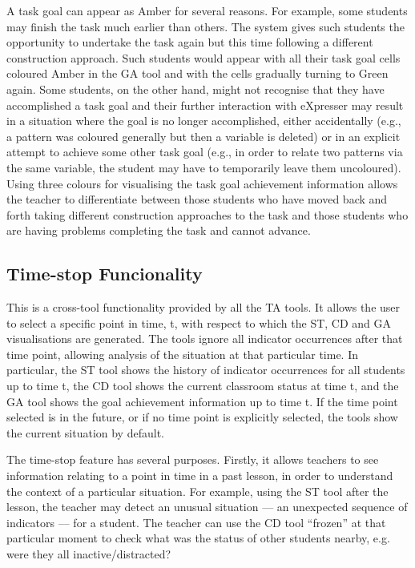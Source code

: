 A task goal can appear as Amber for several reasons. For example, some
students may finish the task much earlier than others. The system
gives such students the opportunity to undertake the task again but
this time following a different construction approach. Such students
would appear with all their task goal cells coloured Amber in the GA
tool and with the cells gradually turning to Green again. Some
students, on the other hand, might not recognise that they have
accomplished a task goal and their further interaction with eXpresser
may result in a situation where the goal is no longer accomplished,
either accidentally (e.g., a pattern was coloured generally but then a
variable is deleted) or in an explicit attempt to achieve some other
task goal (e.g., in order to relate two patterns via the same
variable, the student may have to temporarily leave them
uncoloured). Using three colours for visualising the task goal
achievement information allows the teacher to differentiate between
those students who have moved back and forth taking different
construction approaches to the task and those students who are having
problems completing the task and cannot advance.


\subsection{Time-stop Funcionality}
\label{sec:time-stop-func}

This is a cross-tool functionality provided by all the TA tools. It
allows the user to select a specific point in time, t, with respect to
which the ST, CD and GA visualisations are generated. The tools ignore
all indicator occurrences after that time point, allowing analysis of
the situation at that particular time. In particular, the ST tool
shows the history of indicator occurrences for all students up to time
t, the CD tool shows the current classroom status at time t, and the
GA tool shows the goal achievement information up to time t.  If the
time point selected is in the future, or if no time point is
explicitly selected, the tools show the current situation by default.
 
The time-stop feature has several purposes. Firstly, it allows
teachers to see information relating to a point in time in a past
lesson, in order to understand the context of a particular
situation. For example, using the ST tool after the lesson, the
teacher may detect an unusual situation --- an unexpected sequence of
indicators --- for a student. The teacher can use the CD tool “frozen”
at that particular moment to check what was the status of other
students nearby, e.g. were they all inactive/distracted?
 
